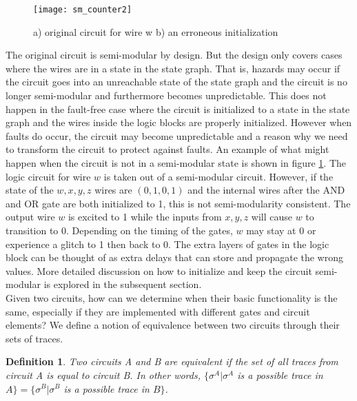 \documentclass[12pt]{report}
\newtheorem*{definition}{Definition}
\begin{document}

\begin{figure}
  \centering
    \texttt{[image: sm\_counter2]}
  \caption{a) original circuit for wire w b) an erroneous initialization}
  \label{fig:sm_counter2}
\end{figure}

The original circuit is semi-modular by design.  But the design only covers cases where the wires are in a state in the state graph.  That is, hazards may occur if the circuit goes into an unreachable state of the state graph and the circuit is no longer semi-modular and furthermore becomes unpredictable.  This does not happen in the fault-free case where the circuit is initialized to a state in the state graph and the wires inside the logic blocks are properly initialized.  However when faults do occur, the circuit may become unpredictable and a reason why we need to transform the circuit to protect against faults.  An example of what might happen when the circuit is not in a semi-modular state is shown in figure \ref{fig:sm_counter2}.  The logic circuit for wire $w$ is taken out of a semi-modular circuit.  However, if the state of the $w,x,y,z$ wires are $(0,1,0,1)$ and the internal wires after the AND and OR gate are both initialized to 1, this is not semi-modularity consistent.  The output wire $w$ is excited to 1 while the inputs from $x,y,z$ will cause $w$ to transition to 0.  Depending on the timing of the gates, $w$ may stay at 0 or experience a glitch to 1 then back to 0.  The extra layers of gates in the logic block can be thought of as extra delays that can store and propagate the wrong values.  More detailed discussion on how to initialize and keep the circuit semi-modular is explored in the subsequent section.\\

Given two circuits, how can we determine when their basic functionality is the same, especially if they are implemented with different gates and circuit elements?  We define a notion of equivalence between two circuits through their sets of traces.  
\begin{definition} Two circuits A and B are {\em equivalent} if the set of all traces from circuit A is equal to circuit B.  In other words, $\{\sigma^A |\sigma^A$ is a possible trace in $A\}=\{\sigma^B |\sigma^B$ is a possible trace in $B\}$.
\end{definition}
\end{document}
